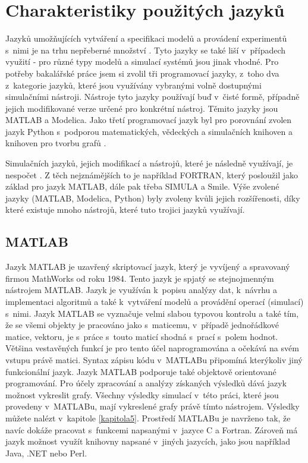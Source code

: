 \section{Charakteristiky použitých jazyků}
\label{popis-jazyky}
Jazyků umožňujících vytváření a specifikaci modelů a provádení experimentů s~nimi je na trhu nepřeberné množství \cite{list-of-process-modelling-lang}. Tyto jazyky se také liší v~případech využití - pro různé typy modelů a simulací systémů jsou jinak vhodné. Pro potřeby bakalářské práce jsem si zvolil tři programovací jazyky, z~toho dva z~kategorie jazyků, které jsou využívány vybranými volně dostupnými simulačními nástroji. Nástroje tyto jazyky používají buď v~čisté formě, případně jejich modifikované verze určené pro konkrétní nástroj. Těmito jazyky jsou MATLAB\cite{MATLAB:2010} a Modelica\cite{Fritzson02modelica--}. Jako třetí programovací jazyk byl pro porovnání zvolen jazyk Python s~podporou matematických, vědeckých a simulačních knihoven a knihoven pro tvorbu grafů \cite{scipy}. 

Simulačních jazyků, jejich modifikací a nástrojů, které je následně využívají, je nespočet \cite{list}. Z těch nejznámějších to je například FORTRAN, který posloužil jako základ pro jazyk MATLAB, dále pak třeba SIMULA a Smile. Výše zvolené jazyky (MATLAB, Modelica, Python) byly zvoleny kvůli jejich rozšířenosti, díky které existuje mnoho nástrojů, které tuto trojici jazyků využívají.

\subsection{MATLAB}
\label{matlab-lang}
Jazyk MATLAB je uzavřený skriptovací jazyk, který je vyvíjený a spravovaný firmou MathWorks od roku 1984. Tento jazyk je spjatý se stejnojmenným nástrojem MATLAB. Jazyk je využíván k~popisu analýzy dat, k~návrhu a implementaci algoritmů a také k~vytváření modelů a provádění operací (simulací) s~nimi. Jazyk MATLAB se vyznačuje velmi slabou typovou kontrolu a také tím, že se všemi objekty je pracováno jako s~maticemu, v~případě jednořádkové matice, vektoru, je s~práce s~touto maticí shodná s~prací s~polem hodnot. Většina vestavěných funkcí je pro tento účel naprogramována a očekává na svém vstupu právě matici. Syntax zápisu kódu v~MATLABu připomíná kterýkoliv jiný funkcionální jazyk. Jazyk MATLAB podporuje také objektově orientované programování. Pro účely zpracování a analýzy získaných výsledků dává jazyk možnost vykreslit grafy. Všechny výsledky simulací v~této práci, které jsou provedeny v~MATLABu, mají vykreslené grafy právě tímto nástrojem. Výsledky můžete nalézt v~kapitole \ref{kapitola5}. Prostředí MATLABu je navrženo tak, že navíc dokáže pracovat s~funkcemi napsanými v~jazyce C a Fortran. Zároveň má jazyk možnost využít knihovny napsané v~jiných jazycích, jako jsou například Java, .NET nebo Perl.

